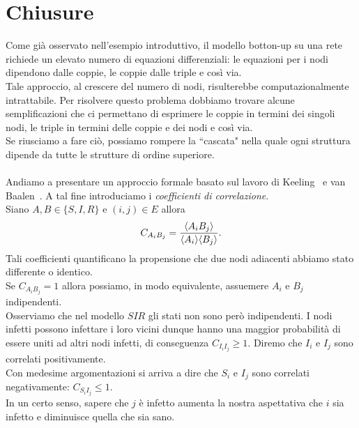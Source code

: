 \section{Chiusure}
Come gi\`a osservato nell'esempio introduttivo, il modello botton-up su una rete richiede un elevato numero di equazioni differenziali: le equazioni per i nodi dipendono dalle coppie, le coppie dalle triple e cos\`i via.\\
Tale approccio, al crescere del numero di nodi, risulterebbe computazionalmente intrattabile. Per risolvere questo problema dobbiamo trovare alcune semplificazioni che ci permettano di esprimere le coppie in termini dei singoli nodi, le triple in termini delle coppie e dei nodi e cos\`i via.\\
Se riusciamo a fare ci\`o, possiamo rompere la ``cascata" nella quale ogni struttura dipende da tutte le strutture di ordine superiore.\\ \\
Andiamo a presentare un approccio formale basato sul lavoro di Keeling~\cite{keeling1995ecology}  e van Baalen~\cite{van2000pair}.  A tal fine introduciamo i  \textit{coefficienti di correlazione}.\\
Siano $A, B\in \{ S, I,R\}$ e $(i,j)\in E$ allora 
$$C_{A_i B_j} = \frac{\langle A_i B_j \rangle}{\langle A_i \rangle \langle B_j \rangle}.$$
Tali coefficienti quantificano la propensione che due nodi adiacenti abbiamo stato differente o identico.\\
Se $C_{A_iB_j}=1$ allora possiamo, in modo equivalente, assuemere  $A_i$ e $B_j$ indipendenti.\\
Osserviamo che nel modello $SIR$ gli stati non sono per\`o indipendenti. I nodi infetti possono infettare i loro vicini dunque hanno una maggior probabilit\`a di essere uniti ad altri nodi infetti,  di conseguenza  $C_{I_i I_j}\geq 1$.  Diremo che $I_i$ e $I_j$ sono correlati positivamente.\\
Con medesime argomentazioni si arriva a dire che $S_i$ e $I_j$ sono correlati negativamente: $C_{S_i I_j}\leq 1$.\\
 In un certo senso, sapere che $j$ \`e infetto aumenta la nostra aspettativa  che $i$ sia infetto e diminuisce quella che sia sano.\\
 
